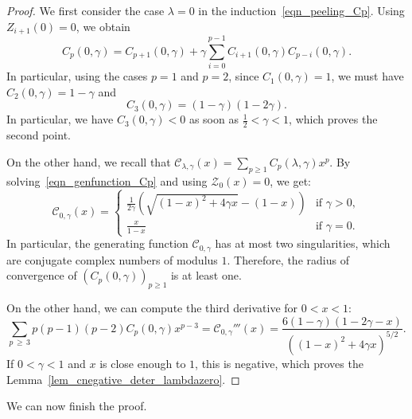\documentclass[10pt]{amsart}
\theoremstyle{definition}\newtheorem{defi}[theo]{Definition}\newtheorem{rema}[theo]{Remark}\newtheorem{exam}[theo]{Example}\newtheorem{exem}[theo]{Example}\newtheorem{nota}[theo]{Notation}
\newcommand{\clZ}{\mathcal{Z}}
\newcommand{\clC}{\mathcal{C}}
\begin{document}
\begin{proof}
We first consider the case $\lambda=0$ in the induction~\eqref{eqn_peeling_Cp}. Using $Z_{i+1}(0)=0$, we obtain
\[
C_p(0,\gamma) = C_{p+1}(0,\gamma) + \gamma \sum_{i=0}^{p-1} C_{i+1}(0, \gamma) C_{p-i}(0, \gamma).
\]
In particular, using the cases $p=1$ and $p=2$, since $C_1(0,\gamma)=1$, we must have $C_2(0,\gamma)=1-\gamma$ and
\begin{equation}\label{eqn_p_equal_to_3}
C_3(0,\gamma)=(1-\gamma)(1-2\gamma).
\end{equation}
In particular, we have $C_3(0,\gamma)<0$ as soon as $\frac{1}{2} < \gamma <1$, which proves the second point.

On the other hand, we recall that $\clC_{\lambda,\gamma}(x)=\sum_{p \geq 1} C_p(\lambda,\gamma) x^p$. By solving~\eqref{eqn_genfunction_Cp} and using $\clZ_0(x)=0$, we get:
\begin{equation}\label{eqn_gf_lambdazero_explicit}
\clC_{0,\gamma}(x)=
\begin{cases}
\frac{1}{2\gamma} \left(\sqrt{(1-x)^2+4\gamma x}-(1-x) \right) & \mbox{if }\gamma>0, \\
\frac{x}{1-x} & \mbox{if }\gamma=0.
\end{cases}
\end{equation}
In particular, the generating function $\clC_{0,\gamma}$ has at most two singularities, which are conjugate complex numbers of modulus $1$. Therefore, the radius of convergence of $\left(C_p(0,\gamma) \right)_{p \geq 1}$ is at least one.

On the other hand, we can compute the third derivative for $0<x<1$:
\[
\sum_{p\,\geq\,3} p(p-1)(p-2) C_p(0,\gamma) x^{p-3} = \clC_{0,\gamma}'''(x) = \frac{6(1-\gamma)(1-2\gamma-x)}{\left((1-x)^2+4\gamma x \right)^{5/2}}.
\]
If $0<\gamma<1$ and $x$ is close enough to $1$, this is negative, which proves the Lemma~\ref{lem_cnegative_deter_lambdazero}.
\end{proof}

We can now finish the proof.
\end{document}
